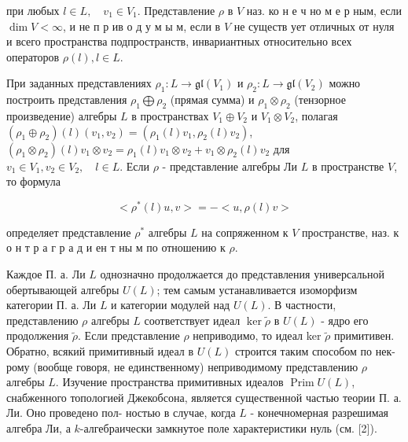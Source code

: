 \documentclass[10pt]{article}
\begin{document}
при любых $l \in L, \quad v_{1} \in V_{1}$. Представление $\rho$ в $V$ наз. ко н е ч но м е р ным, если $\operatorname{dim} V<\infty$, и не п р ив о д у м ы м, если в $V$ не существ ует отличных от нуля и всего пространства подпространств, инвариантных относительно всех операторов $\rho(l), l \in L$.



При заданных представлениях $\rho_{1}: L \rightarrow \mathfrak{g l}\left(V_{1}\right)$ и $\rho_{2}: L \rightarrow \mathfrak{g l}\left(V_{2}\right)$ можно построить представления $\rho_{1} \bigoplus \rho_{2}$ (прямая сумма) и $\rho_{1} \otimes \rho_{2}$ (тензорное произведение) алгебры $L$ в пространствах $V_{1} \oplus V_{2}$ и $V_{1} \otimes V_{2}$, полагая $\left(\rho_{1} \oplus \rho_{2}\right)(l)\left(v_{1}, v_{2}\right)=\left(\rho_{1}(l) v_{1}, \rho_{2}(l) v_{2}\right)$, $\left(\rho_{1} \otimes \rho_{2}\right)(l) v_{1} \otimes v_{2}=\rho_{1}(l) v_{1} \otimes v_{2}+v_{1} \otimes \rho_{2}(l) v_{2}$ для $v_{1} \in V_{1}, v_{2} \in V_{2}, \quad l \in L$. Если $\rho$ - представление алгебры Ли $L$ в пространстве $V$, то формула



\[

<\rho^{*}(l) u, v>=-<u, \rho(l) v>

\]



определяет представление $\rho^{*}$ алгебры $L$ на сопряженном к $V$ пространстве, наз. к о н т р а г р а д и ен т ны м по отношению к $\rho$.



Каждое П. а. Ли $L$ однозначно продолжается до представления универсальной обертывающей алгебры $U(L)$; тем самым устанавливается изоморфизм категории П. а. Ли $L$ и категории модулей над $U(L)$. В частности, представлению $\rho$ алгебры $L$ соответствует идеал $\operatorname{ker} \tilde{\rho}$ в $U(L)$ - ядро его продолжения $\tilde{\rho}$. Если представление $\rho$ неприводимо, то идеал ker $\tilde{\rho}$ примитивен. Обратно, всякий примитивный идеал в $U(L)$ строится таким способом по нек-рому (вообще говоря, не единственному) неприводимому представлению $\rho$ алгебры $L$. Изучение пространства примитивных идеалов $\operatorname{Prim} U(L)$, снабженного топологией Джекобсона, является существенной частью теории П. а. Ли. Оно проведено пол- ностью в случае, когда $L$ - конечномерная разрешимая алгебра Ли, а $k$-алгебраически замкнутое поле характеристики нуль (см. [2]).
\end{document}
